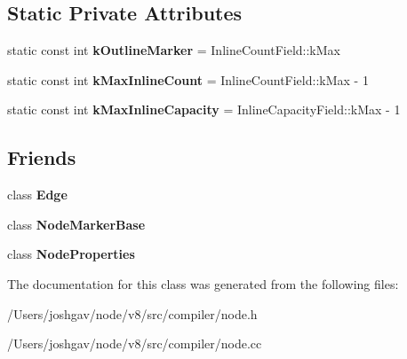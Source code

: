 \subsection*{Static Private Attributes}
\begin{DoxyCompactItemize}
\item 
static const int {\bfseries k\+Outline\+Marker} = Inline\+Count\+Field\+::k\+Max\hypertarget{classv8_1_1internal_1_1compiler_1_1_node_ad63c39c343bd29aa157ab9e116fc7c5a}{}\label{classv8_1_1internal_1_1compiler_1_1_node_ad63c39c343bd29aa157ab9e116fc7c5a}

\item 
static const int {\bfseries k\+Max\+Inline\+Count} = Inline\+Count\+Field\+::k\+Max -\/ 1\hypertarget{classv8_1_1internal_1_1compiler_1_1_node_aa135d54874366a3f39c014581d7cfe6d}{}\label{classv8_1_1internal_1_1compiler_1_1_node_aa135d54874366a3f39c014581d7cfe6d}

\item 
static const int {\bfseries k\+Max\+Inline\+Capacity} = Inline\+Capacity\+Field\+::k\+Max -\/ 1\hypertarget{classv8_1_1internal_1_1compiler_1_1_node_ac187c8262dfc2b1f18a2c236f4324ced}{}\label{classv8_1_1internal_1_1compiler_1_1_node_ac187c8262dfc2b1f18a2c236f4324ced}

\end{DoxyCompactItemize}
\subsection*{Friends}
\begin{DoxyCompactItemize}
\item 
class {\bfseries Edge}\hypertarget{classv8_1_1internal_1_1compiler_1_1_node_ad2c8ba04c9d9989ccbf3c5aba267a3d7}{}\label{classv8_1_1internal_1_1compiler_1_1_node_ad2c8ba04c9d9989ccbf3c5aba267a3d7}

\item 
class {\bfseries Node\+Marker\+Base}\hypertarget{classv8_1_1internal_1_1compiler_1_1_node_a300aff091dd808ac2a77b73336b03672}{}\label{classv8_1_1internal_1_1compiler_1_1_node_a300aff091dd808ac2a77b73336b03672}

\item 
class {\bfseries Node\+Properties}\hypertarget{classv8_1_1internal_1_1compiler_1_1_node_a455dfadd6114e8214b66e252ceeac436}{}\label{classv8_1_1internal_1_1compiler_1_1_node_a455dfadd6114e8214b66e252ceeac436}

\end{DoxyCompactItemize}


The documentation for this class was generated from the following files\+:\begin{DoxyCompactItemize}
\item 
/\+Users/joshgav/node/v8/src/compiler/node.\+h\item 
/\+Users/joshgav/node/v8/src/compiler/node.\+cc\end{DoxyCompactItemize}
